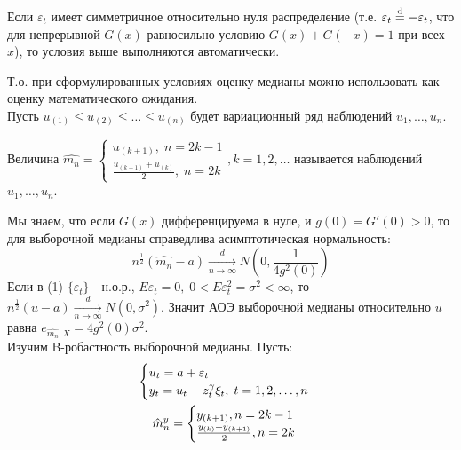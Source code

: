 Если $\varepsilon_t$ имеет симметричное относительно нуля распределение (т.е. $\varepsilon_t \mathrel{\stackrel{\rm d}=} -\varepsilon_t$, что для непрерывной $G(x)$ равносильно условию $G(x) + G(-x) = 1$ при всех $x$), то условия выше выполняются автоматически.

Т.о. при сформулированных условиях оценку медианы можно использовать как оценку математического ожидания.\\

Пусть $u_{(1)} \le u_{(2)} \le \dots \le u_{(n)}$ будет вариационный ряд наблюдений $u_1, \dots, u_n$.

\begin{definition}\label{lec:9/def:1}
	Величина $\hat{m_n} = \begin{cases}
		u_{(k+1)}, \; n = 2 k - 1 \\
		\frac{u_{(k+1)} + u_{(k)}}{2}, \; n = 2 k
	\end{cases}, k = 1, 2, \dots$ называется  наблюдений $u_1, \dots, u_n$.
\end{definition}

Мы знаем, что если $G(x)$ дифференцируема в нуле, и $g(0) = G' (0) > 0$, то для выборочной медианы справедлива асимптотическая нормальность:
$$n^{\frac{1}{2}} (\hat{m_n} - a) \xrightarrow[n \to \infty]{d} N \left(0, \frac{1}{4 g^2 (0)}\right)$$
Если в (1) $\{\varepsilon_t\}$ - н.о.р., $E \varepsilon_t = 0, \; 0 < E \varepsilon_t^2 = \sigma^2 < \infty$, то $n^{\frac{1}{2}} (\overline{u} - a) \xrightarrow[n \to \infty]{d} N(0, \sigma^2)$. Значит АОЭ выборочной медианы относительно $\overline{u}$ равна $e_{\hat{m_n}, \overline{X}} = 4 g^2 (0) \sigma^2$.\\

Изучим B-робастность выборочной медианы. Пусть:
$$\begin{gathered}
	\begin{cases}
		u_t = a + \varepsilon_t \\
		y_t = u_t + z_t^{\gamma} \xi_t, \; t = 1,2,\dots,n
	\end{cases} \\
	\hat{m}_n^y = \begin{cases}
		y_{(k+1)}, n = 2k-1 \\
		\frac{y_{(k)} + y_{(k+1)}}{2}, n = 2k
	\end{cases}
\end{gathered}$$

